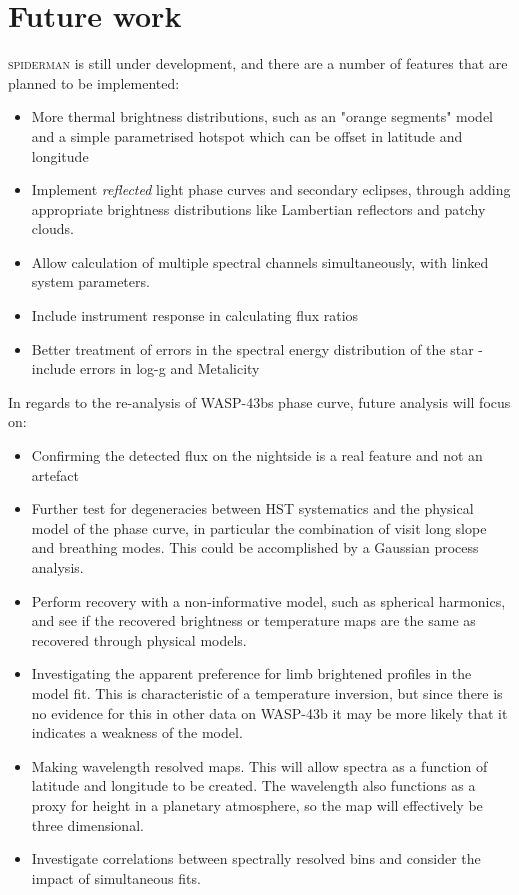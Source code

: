 \documentclass[a4paper,fleqn,usenatbib]{mnras}
\begin{document}
\section{Future work}\label{sec:future work}

\textsc{spiderman} is still under development, and there are a number of features that are planned to be implemented:

\begin{itemize}
\item More thermal brightness distributions, such as an "orange segments" model and a simple parametrised hotspot which can be offset in latitude and longitude
\item Implement \emph{reflected} light phase curves and secondary eclipses, through adding appropriate brightness distributions like Lambertian reflectors and patchy clouds.
\item Allow calculation of multiple spectral channels simultaneously, with linked system parameters.
\item Include instrument response in calculating flux ratios
\item Better treatment of errors in the spectral energy distribution of the star - include errors in log-g and Metalicity
\end{itemize}

In regards to the re-analysis of WASP-43bs phase curve, future analysis will focus on:

\begin{itemize}
\item Confirming the detected flux on the nightside is a real feature and not an artefact
\item Further test for degeneracies between HST systematics and the physical model of the phase curve, in particular the combination of visit long slope and breathing modes. This could be accomplished by a Gaussian process analysis.
\item Perform recovery with a non-informative model, such as spherical harmonics, and see if the recovered brightness or temperature maps are the same as recovered through physical models.
\item Investigating the apparent preference for limb brightened profiles in the model fit. This is characteristic of a temperature inversion, but since there is no evidence for this in other data on WASP-43b it may be more likely that it indicates a weakness of the model.
\item Making wavelength resolved maps. This will allow spectra as a function of latitude and longitude to be created. The wavelength also functions as a proxy for height in a planetary atmosphere, so the map will effectively be three dimensional.
\item Investigate correlations between spectrally resolved bins and consider the impact of simultaneous fits.
\end{itemize}
\end{document}
